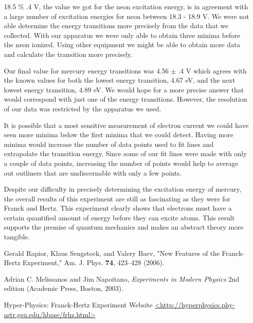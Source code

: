 \documentclass[prb,preprint]{revtex4-1}
\begin{document}
18.5 $\%$ .4 V, the value we got for the neon excitation energy, is in agreement with a large number of excitation energies for neon between 18.3 - 18.9 V. We were not able determine the energy transitions more precisely from the data that we collected. With our apparatus we were only able to obtain three minima before the neon ionized. Using other equipment we might be able to obtain more data and calculate the transition more precisely.

Our final value for mercury energy transitions was 4.56 $\pm$ .4 V which agrees with the known values for both the lowest energy transition, 4.67 eV, and the next lowest energy transition, 4.89 eV. We would hope for a more precise answer that would correspond with just one of the energy transitions. However, the resolution of our data was restricted by the apparatus we used.

It is possible that a most sensitive measurement of electron current we could have seen more minima below the first minima that we could detect. Having more minima would increase the number of data points used to fit lines and extrapolate the transition energy. Since some of our fit lines were made with only a couple of data points, increasing the number of points would help to average out outliners that are undiscernable with only a few points. 

Despite our difficulty in precisely determining the excitation energy of mercury, the overall results of this experiment are still as fascinating as they were for Franck and Hertz. This experiment clearly shows that electrons must have a certain quantified amount of energy before they can excite atoms. This result supports the premise of quantum mechanics and makes an abstract theory more tangible.

\begin{thebibliography}{9}


 Gerald Rapior, Klaus Sengstock, and Valery Baev, "New Features of the Franck-Hertz Experiment,"  Am. J. Phys. \textbf{74}, 423--428 (2006). 

 Adrian C. Melissanos and Jim Napoitano, \textit{Experiments in Modern Physics} 2nd edition (Academic Press, Boston, 2003).

 Hyper-Physics: Franck-Hertz Experiment Website \url{<http://hyperphysics.phy-astr.gsu.edu/hbase/frhz.html>}

\end{thebibliography}
\end{document}
